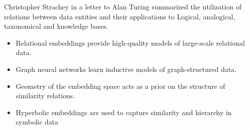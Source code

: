 Christopher Strachey in a letter to Alan Turing summarized the utilization of relations  between data entities and their applications to Logical, analogical, taxonomical and knowledge bases.


\begin{itemize}
    \item Relational embeddings provide high-quality models of large-scale relational data.
    \item Graph neural networks learn inductive models of graph-structured data.
    \item Geometry of the embedding space acts as a prior on the structure of similarity relations.
    \item Hyperbolic embeddings are used to capture similarity and hierarchy in symbolic data
\end{itemize}
